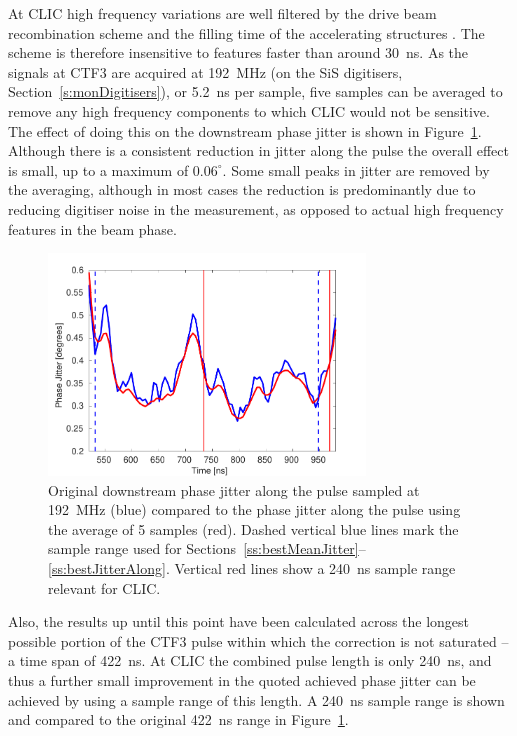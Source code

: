 At CLIC high frequency
variations are well filtered by the drive beam recombination scheme and the filling time
of the accelerating structures \cite{alexThesis}. The scheme is therefore insensitive to 
features faster than around 30~ns. As the signals at CTF3 are acquired at 192~MHz (on the
SiS digitisers, Section~\ref{s:monDigitisers}), or 5.2~ns per sample, five samples can be
averaged to remove any high frequency components to which CLIC would not be sensitive. The effect of doing this on the downstream phase jitter is shown in Figure~\ref{f:BestFF_CLICPulse}. Although there is a consistent reduction in jitter along the pulse the overall effect is small, up to a maximum of \(0.06^\circ\). 
Some small peaks in jitter are removed by the averaging, although in most cases the reduction is predominantly due to reducing digitiser noise in the measurement, as opposed to actual high frequency features in the beam phase.

\begin{figure}
  \centering
  \includegraphics[width=0.75\textwidth]{Figures/feedforward/BestFF_CLICPulse}
  \caption{Original downstream phase jitter along the pulse sampled at 192~MHz (blue) compared to
  the phase jitter along the pulse using the average of 5 samples (red). Dashed vertical
  blue lines mark the sample range used for Sections~\ref{ss:bestMeanJitter}--\ref{ss:bestJitterAlong}. Vertical red lines
  show a 240~ns sample range relevant for CLIC.}
  \label{f:BestFF_CLICPulse}
\end{figure}

Also, the results up until this point have been calculated across the longest possible
portion of the CTF3 pulse within which the correction is not saturated -- a time span of 422~ns. At CLIC the combined pulse length is only 240~ns, and thus a further small improvement in the quoted achieved phase jitter can be achieved by using a sample range of this length. A 240~ns sample range is shown and compared to the original 422~ns range in Figure~\ref{f:BestFF_CLICPulse}.

